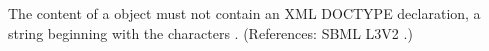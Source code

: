 The content of a \Notes object must not contain an XML
DOCTYPE declaration, \ie a string beginning with the characters
.  (References: SBML L3V2 .)
